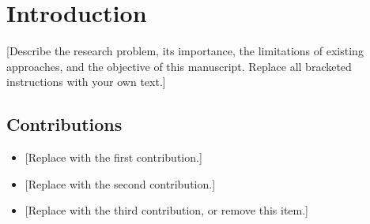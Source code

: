 \section{Introduction}\label{sec:introduction}
[Describe the research problem, its importance, the limitations of existing
approaches, and the objective of this manuscript. Replace all bracketed
instructions with your own text.]

\subsection{Contributions}
\begin{itemize}
  \item {[Replace with the first contribution.]}
  \item {[Replace with the second contribution.]}
  \item {[Replace with the third contribution, or remove this item.]}
\end{itemize}
